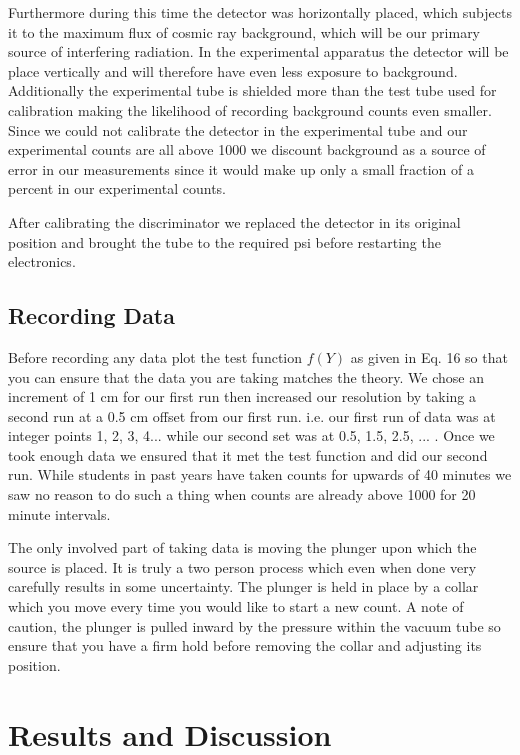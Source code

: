 \indent \indent Furthermore during this time the detector was horizontally placed, which subjects it to the maximum flux of cosmic ray background, which will be our primary source of interfering radiation.  In the experimental apparatus the detector will be place vertically and will therefore have even less exposure to background. Additionally the experimental tube is shielded more than the test tube used for calibration making the likelihood of recording background counts even smaller.  Since we could not calibrate the detector in the experimental tube and our experimental counts are all above 1000 we discount background as a source of error in our measurements since it would make up only a small fraction of a percent in our experimental counts.  

\indent \indent After calibrating the discriminator we replaced the detector in its original position and brought the tube to the required psi before restarting the electronics. 


\subsection{Recording Data}
\indent \indent Before recording any data plot the test function $f(Y)$ as given in Eq. 16 so that you can ensure that the data you are taking matches the theory.  We chose an increment of 1 cm for our first run then increased our resolution by taking a second run at a 0.5 cm offset from our first run.  i.e. our first run of data was at integer points 1, 2, 3, 4... while our second set was at 0.5, 1.5, 2.5, ... . Once we took enough data we ensured that it met the test function and did our second run.  While students in past years have taken counts for upwards of 40 minutes we saw no reason to do such a thing when counts are already above 1000 for 20 minute intervals.  

\indent \indent The only involved part of taking data is moving the plunger upon which the source is placed.  It is truly a two person process which even when done very carefully results in some uncertainty.  The plunger is held in place by a collar which you move every time you would like to start a new count.  A note of caution, the plunger is pulled inward by the pressure within the vacuum tube so ensure that you have a firm hold before removing the collar and adjusting its position. 

\section{Results and Discussion}
